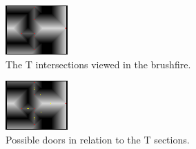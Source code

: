 \begin{figure}[ht]
\begin{subfigure}[t]{0.3\textwidth}
    \includegraphics[width = \textwidth]{graphics/door_intersection}
    \caption{The T intersections viewed in the brushfire.}
    \label{intersections}
  \end{subfigure}
  \begin{subfigure}[t]{0.3\textwidth}
    \includegraphics[width = \textwidth]{graphics/possible_doors}
    \caption{Possible doors in relation to the T sections.}
    \label{possible_doors}
  \end{subfigure}
  \begin{subfigure}[t]{0.3\textwidth}

\end{subfigure}
\end{figure}
